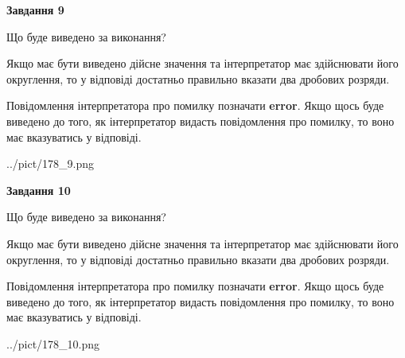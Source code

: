 \documentclass[12pt, ukrainian]{article}
\begin{document}
{\begin {Large}
{\begin {center}\textbf{Завдання 9}\end {center}}\par
Що буде виведено за виконання? \par

Якщо має бути виведено дійсне значення та інтерпретатор має здійснювати його округлення, 
то у відповіді достатньо правильно вказати два дробових розряди.

Повідомлення інтерпретатора про помилку позначати \textbf{error}.
Якщо щось буде виведено до того, як інтерпретатор видасть повідомлення про помилку, 
то воно має вказуватись у відповіді. \par

\begin{center}
	{../pict/178_9.png}
\end{center}
\newpage

{\begin {center}\textbf{Завдання 10}\end {center}}\par
Що буде виведено за виконання? \par

Якщо має бути виведено дійсне значення та інтерпретатор має здійснювати його округлення, 
то у відповіді достатньо правильно вказати два дробових розряди.

Повідомлення інтерпретатора про помилку позначати \textbf{error}.
Якщо щось буде виведено до того, як інтерпретатор видасть повідомлення про помилку, 
то воно має вказуватись у відповіді. \par

\begin{center}
	{../pict/178_10.png}
\end{center}
\newpage

\end {Large}}
\end{document}
